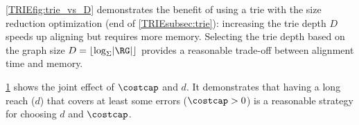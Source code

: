 \begin{figure}[t]
\begin{minipage}{0.45\linewidth}
		\label{TRIEfig:heuristic-parameters}
	\end{minipage}
\end{figure}

\cref{TRIEfig:trie_vs_D} demonstrates the benefit of using a trie with the size
reduction optimization (end of \cref{TRIEsubsec:trie}): increasing the trie depth
$D$ speeds up aligning but requires more memory. Selecting the trie depth based
on the graph size \mbox{$D = \lfloor \log_\Sigma \lvert \RG \rvert \rfloor$}
provides a reasonable trade-off between alignment time and memory.

\cref{TRIEfig:heuristic-parameters} shows the joint effect of $\costcap$ and $d$. It
demonstrates that having a long reach ($d$) that covers at least some errors
($\costcap > 0$) is a reasonable strategy for choosing $d$ and $\costcap$.
